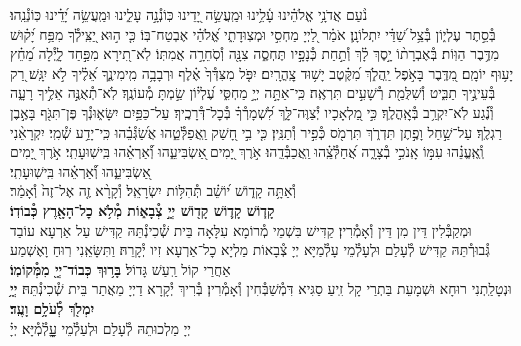 \documentclass[twoside, openany, parskip=half, 11pt]{book}
\begin{document}
\begin{sometimes}


\halfkaddish


\label{vihi noam}

נֹ֨עַם אֲדֹנָ֥י אֱלֹהֵ֗ינוּ עָ֫לֵ֥ינוּ וּמַֽעֲשֵׂ֣ה יָ֭דֵינוּ כּֽוֹנְ֯נָ֣ה עָלֵ֑ינוּ וּמַֽעֲשֵׂ֥ה יָ֝דֵ֗ינוּ כּֽוֹנְ֯נֵֽהוּ׃\\
בְּ֯סֵ֣תֶר עֶלְי֑וֹן בְּ֯צֵ֥ל שַׁ֝דַּ֗י יִתְלוֹנָֽן׃
אֹמַ֗ר לַ֭יְיָ מַחְסִ֣י וּמְצֽוּדָתִ֑י אֱ֝לֹהַ֗י אֶבְטַח־בּֽוֹ׃
כִּ֤י ה֣וּא יַ֭צִּֽילְ֯ךָ מִפַּ֥ח יָ֝ק֗וּשׁ מִדֶּ֥בֶר הַוּֽוֹת׃
בְּ֯אֶבְרָת֨וֹ יָ֣סֶךְ לָ֗ךְ וְ֯תַ֣חַת כְּ֯נָפָ֣יו תֶּחְסֶ֑ה צִנָּ֖ה וְ֯סֹֽחֵרָ֣ה אֲמִתּֽוֹ׃
לֹֽא־תִ֭ירָא מִפַּ֣חַד לָ֑יְ֯לָה מֵ֝חֵ֗ץ יָע֥וּף יוֹמָֽם׃
מִ֭דֶּֽבֶר בָּאֹ֣פֶל יַֽהֲלֹ֑ךְ מִ֝קֶּ֗טֶב יָשׁ֥וּד צׇֽהֳרָֽיִם׃
יִפֹּ֤ל מִצִּדְּ֯ךָ֙ אֶ֗לֶף וּרְבָבָ֥ה מִֽימִינֶ֑ךָ אֵ֝לֶ֗יךָ לֹ֣א יִגָּֽשׁ׃
רַ֭ק בְּ֯עֵינֶ֣יךָ תַבִּ֑יט וְ֯שִׁלֻּמַ֖ת רְ֯שָׁעִ֣ים תִּרְאֶֽה׃
כִּֽי־אַתָּ֣ה יְיָ֣ מַחְסִּ֑י עֶ֝לְי֗וֹן שַׂ֣מְתָּ מְ֯עוֹנֶֽךָ׃
לֹֽא־תְ֯אֻנֶּ֣ה אֵלֶ֣יךָ רָעָ֑ה וְ֯נֶ֗֝גַע לֹֽא־יִקְרַ֥ב בְּ֯אׇֽהֳלֶֽךָ׃
כִּ֣י מַ֭לְאָכָיו יְ֯צַוֶּה־לָּ֑ךְ לִ֝שְׁמָרְ֯ךָ֗ בְּ֯כׇל־דְּ֯רָכֶֽיךָ׃
עַל־כַּפַּ֥יִם יִשָּׂא֑וּנְ֯ךָ פֶּן־תִּגֹּ֖ף בָּאֶ֣בֶן רַגְלֶֽךָ׃
עַל־שַׁ֣חַל וָפֶ֣תֶן תִּדְרֹ֑ךְ תִּרְמֹ֖ס כְּ֯פִ֣יר וְ֯תַנִּֽין׃
כִּ֤י בִ֣י חָ֭שַׁק וַֽאֲפַלְּ֯טֵ֑הוּ אֲשַׂ֝גְּ֯בֵ֗הוּ כִּֽי־יָדַ֥ע שְׁ֯מִֽי׃
יִקְרָאֵ֨נִי וְֽ֯אֶֽעֱנֵ֗הוּ עִמּ֣וֹ אָֽנֹכִ֣י בְ֯צָרָ֑ה אֲ֝חַלְּ֯צֵֽ֗הוּ וַֽאֲכַבְּ֯דֵֽהוּ׃
אֹ֣רֶךְ יָ֭מִים ֖אַשְׂבִּיעֵ֑הוּ וְ֝֯אַרְאֵ֗הוּ בִּֽישֽׁוּעָתִֽי׃
אֹ֣רֶךְ יָ֭מִים ֖אַשְׂבִּיעֵ֑הוּ וְ֝֯אַרְאֵ֗הוּ בִּֽישֽׁוּעָתִֽי׃\\
\label{v ata kadosh}
וְ֯אַתָּ֥ה
%
קָד֑וֹשׁ י֝וֹשֵׁ֗ב תְּ֯הִלּ֥וֹת יִשְׂרָאֵֽל׃
%
וְ֯קָרָ֨א זֶ֤ה אֶל־זֶה֙ וְ֯אָמַ֔ר׃\\
\textbf{קָד֧וֹשׁ קָד֛וֹשׁ קָד֖וֹשׁ יְיָ֣ צְ֯בָא֑וֹת מְ֯לֹ֥א כׇל־הָאָ֖רֶץ כְּ֯בוֹדֽוֹ׃}\\
וּמְקַבְּ֯לִין דֵּין מִן דֵּין וְ֯אָמְ֯רִין׃ קַדִּישׁ בִּשְׁמֵי מְ֯רוֹמָא עִלָּאָה בֵּית שְׁ֯כִינְ֯תֵּהּ קַדִּישׁ עַל אַרְעָא עוֹבַד גְּ֯בוּרְ֯תֵּהּ קַדִּישׁ לְ֯עָלַם וּלְעָלְ֯מֵי עָלְ֯מַיָּא יְיָ צְ֯בָאוֹת מַלְיָא כׇל־אַרְעָא זִיו יְ֯קָרֵהּ׃ וַתִּשָּׂאֵֽנִי רֽוּחַ וָאֶשְׁמַע אַחֲרַי קוֹל רַֽעַשׁ גָּדוֹל׃
\textbf{בָּר֥וּךְ כְּבוֹד־יְיָ֖ מִמְּ֯קוֹמֽוֹ׃} \\
וּנְטָלַֽתְנִי רוּחָא וּשְׁמָעֵת בַּתְרַי קָל זִֽיעַ סַגִּיא דִּמְ֯שַׁבְּ֯חִין וְ֯אָמְ֯רִין׃ בְּ֯רִיךְ יְ֯קָרָא דַיְיָ מֵאֲתַר בֵּית שְׁ֯כִינְ֯תֵּהּ׃
\textbf{יְיָ֥ יִמְלֹ֖ךְ לְ֯עֹלָ֥ם וָעֶֽד׃} \\
יְיָ מַלְכוּתֵהּ לְ֯עָלַם וּלְעַלְ֯מֵי עׇׇׇׇׇלְ֯מְ֯יָּא׃ יְיָ֗

\end{sometimes}
\end{document}
